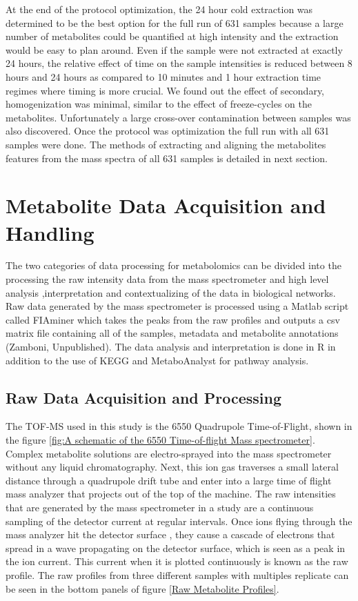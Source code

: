 \documentclass[a4paper,11pt,twoside]{book}
\begin{document}
	At the end of the protocol optimization, the 24 hour cold extraction was determined to be the best option for the full run of 631 samples because a large number of metabolites could be quantified at high intensity and the extraction would be easy to plan around. Even if the sample were not extracted at exactly 24 hours, the relative effect of time on the sample intensities is reduced between 8 hours and 24 hours as compared to 10 minutes and 1 hour extraction time regimes where timing is more crucial. We found out the effect of secondary, homogenization was minimal, similar to the effect of freeze-cycles on the metabolites. Unfortunately a large cross-over contamination between samples was also discovered. Once the protocol was optimization the full run with all 631 samples were done. The methods of extracting and aligning the metabolites features from the mass spectra of all 631 samples is detailed in next section.
	
	\clearpage
	\section{Metabolite Data Acquisition and Handling}
	
	The two categories of data processing for metabolomics can be divided into the processing the raw intensity data from the mass spectrometer and high level analysis ,interpretation and contextualizing of the data in biological networks. Raw data generated by the mass spectrometer is processed using a Matlab script called FIAminer which takes the peaks from the raw profiles and outputs a csv matrix file containing all of the samples, metadata and metabolite annotations (Zamboni, Unpublished). The data analysis and interpretation is done in R in addition to the use of KEGG \citep{Kanehisa2017} and MetaboAnalyst\citep{Xia2016UsingAnalysis} for pathway analysis.
	
	\subsection{Raw Data Acquisition and Processing}
	
    The TOF-MS used in this study is the 6550 Quadrupole Time-of-Flight, shown in the figure \ref{fig:A schematic of the 6550 Time-of-flight Mass spectrometer}. Complex metabolite solutions are electro-sprayed into the mass spectrometer without any liquid chromatography. Next, this ion gas traverses a small lateral distance through a quadrupole drift tube and enter into a large time of flight mass analyzer that projects out of the top of the machine. The raw intensities that are generated by the mass spectrometer in a study are a continuous sampling of the detector current at regular intervals. Once ions flying through the mass analyzer hit the detector surface \citep{Glish2003TheCentury}, they cause a cascade of electrons that spread in a wave propagating on the detector surface, which is seen as a peak in the ion current. This current when it is plotted continuously is known as the raw profile. The raw profiles from three different samples with multiples replicate can be seen in the bottom panels of figure \ref{Raw Metabolite Profiles}. 
	
\end{document}
